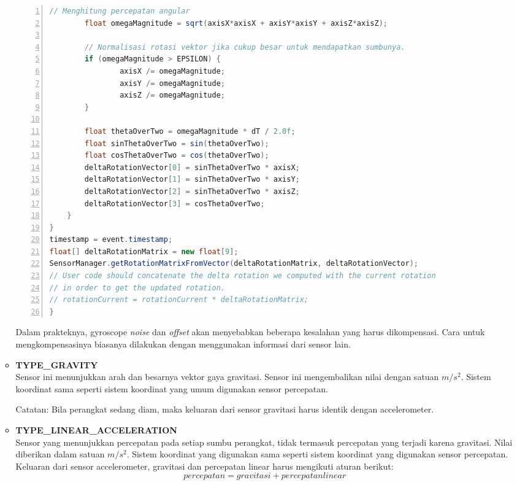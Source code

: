 \documentclass[a4paper,twoside]{article}
\begin{document}
\begin{enumerate}
\begin{itemize}
\begin{lstlisting}[language=java,numbers=left,breaklines=true,caption=contoh implementasi gyroscope,label={lst:gryoscope-example}]
		// Menghitung percepatan angular
		float omegaMagnitude = sqrt(axisX*axisX + axisY*axisY + axisZ*axisZ);

		// Normalisasi rotasi vektor jika cukup besar untuk mendapatkan sumbunya.
		if (omegaMagnitude > EPSILON) {
				axisX /= omegaMagnitude;
				axisY /= omegaMagnitude;
				axisZ /= omegaMagnitude;
		}
		
		float thetaOverTwo = omegaMagnitude * dT / 2.0f;
		float sinThetaOverTwo = sin(thetaOverTwo);
		float cosThetaOverTwo = cos(thetaOverTwo);
		deltaRotationVector[0] = sinThetaOverTwo * axisX;
		deltaRotationVector[1] = sinThetaOverTwo * axisY;
		deltaRotationVector[2] = sinThetaOverTwo * axisZ;
		deltaRotationVector[3] = cosThetaOverTwo;
	}
}
timestamp = event.timestamp;
float[] deltaRotationMatrix = new float[9];
SensorManager.getRotationMatrixFromVector(deltaRotationMatrix, deltaRotationVector);
// User code should concatenate the delta rotation we computed with the current rotation
// in order to get the updated rotation.
// rotationCurrent = rotationCurrent * deltaRotationMatrix;
}

\end{lstlisting}
Dalam prakteknya, gyroscope \textit{noise} dan \textit{offset} akan menyebabkan beberapa kesalahan yang harus dikompensasi. Cara untuk mengkompensasinya biasanya dilakukan dengan menggunakan informasi dari sensor lain.\\
\item \textbf{TYPE\_GRAVITY}\\
Sensor ini menunjukkan arah dan besarnya vektor gaya gravitasi. Sensor ini mengembalikan nilai dengan satuan \(m/s^2\). Sistem koordinat sama seperti sistem koordinat yang umum digunakan sensor percepatan. 

Catatan: Bila perangkat sedang diam, maka keluaran dari sensor gravitasi harus identik dengan accelerometer. \\

\item \textbf{TYPE\_LINEAR\_ACCELERATION}\\
Sensor yang menunjukkan percepatan pada setiap sumbu perangkat, tidak termasuk percepatan yang terjadi karena gravitasi. Nilai diberikan dalam satuan \(m/s^2\). Sistem koordinat yang digunakan sama seperti sistem koordinat yang digunakan sensor percepatan. Keluaran dari sensor accelerometer, gravitasi dan percepatan linear harus mengikuti aturan berikut:
\[
	percepatan = gravitasi + percepatan linear
\]\\


\end{itemize}
\end{enumerate}
\end{document}
